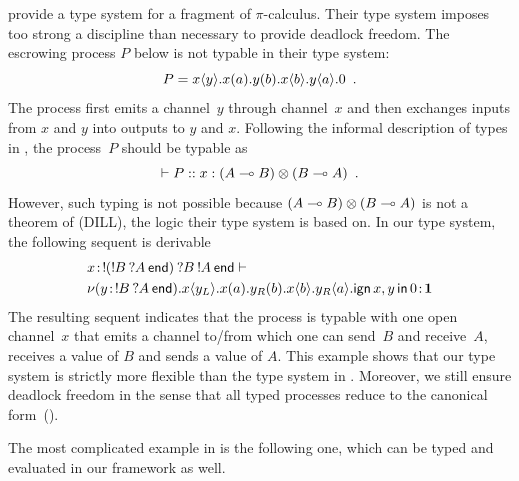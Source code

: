 \citet{pfenning2010} provide a type system for a fragment of $\pi$-calculus.
Their type system imposes too strong a discipline
than necessary to provide deadlock freedom.
The escrowing process $P$ below is not typable in their type
system:
\[
 P = {x}\langle{y}\rangle.{{{x}({a}).{{{y}({b}).{{x}\langle{b}\rangle.{{y}\langle{a}\rangle.{0}}}}}}}\enspace.
\]
The process first emits a channel~$y$ through channel~$x$ and then
exchanges inputs from $x$ and $y$ into outputs to $y$ and $x$.
Following the informal description of types in \citep{pfenning2010},
the process~$P$ should be typable as
\[
 \vdash P::x:(A\multimap B)\otimes(B\multimap A)\enspace.
\]
However, such typing is not possible because $(A\multimap B)\otimes (B\multimap
A)$ is not a theorem of  (DILL), the logic their type system
is based on.
In our type system, the following sequent is derivable
\begin{align*}
&
{x} \mathord{\colon\kern -2pt}{\mathop{!}\kern -2pt{(\mathop{!}\kern -2pt{B}\hskip 2pt{\mathop{?}\kern -2pt{A}\hskip 2pt{\mathsf{end}}})}\hskip 2pt{\mathop{?}\kern -2pt{B}\hskip 2pt{\mathop{!}\kern -2pt{A}\hskip 2pt{\mathsf{end}}}}}
\vdash\\
&{
\nu({y} \mathord{\colon\kern -2pt}{\mathop{!}\kern -2pt{B}\hskip 2pt{\mathop{?}\kern -2pt{A}\hskip 2pt{\mathsf{end}}}}).
{{x}\langle{y_L}\rangle.{{{x}({a}).{{{y_R}({b}).{{x}\langle{b}\rangle.{{y_R}\langle{a}\rangle.{\mathsf{ign }\,{x,y}\,\mathsf{ in }\,{0}}}}}}}}}
} \mathord{\colon\kern -2pt}{\mathbf{1}}
\end{align*}
The resulting sequent indicates that the process is typable with one
open channel~$x$ that emits
a channel to/from which one can send~$B$ and receive~$A$, receives a
value of $B$ and
sends a value of $A$.
This example shows that our type system is strictly more flexible than
the type system in \citet{pfenning2010}.
Moreover, we still ensure deadlock freedom in the sense that all typed
processes reduce to the canonical form~().

The most complicated example in \citet{pfenning2010} is the following
one, which can be typed and evaluated in our framework as well.

